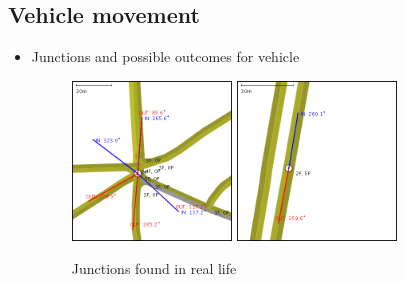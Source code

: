 \subsection{Vehicle movement}
\begin{itemize}
    \item Junctions and possible outcomes for vehicle
        \begin{figure}[h]
            \caption{Junctions found in real life}
            \label{fig:junctionTypes}
            \centering
            \includegraphics[width=0.4\textwidth]{figs/junction/junction_5_roads.png}
            \hspace{0.2em}
            \includegraphics[width=0.4\textwidth]{figs/junction/junction_two_roads.png}
        \end{figure}


\end{itemize}
